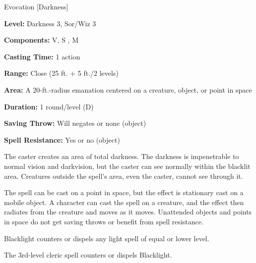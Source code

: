 
Evocation [Darkness]

\textbf{Level:} Darkness 3, Sor/Wiz 3

\textbf{Components:} V, S , M

\textbf{Casting Time:} 1 action

\textbf{Range:} Close (25 ft. + 5 ft./2 levels)

\textbf{Area:} A 20-ft.-radius emanation centered on a creature, object, or point in space

\textbf{Duration:} 1 round/level (D)

\textbf{Saving Throw:} Will negates or none (object)

\textbf{Spell Resistance:} Yes or no (object)

The caster creates an area of total darkness. The darkness is impenetrable to normal 
vision and darkvision, but the caster can see normally within the blacklit area. 
Creatures outside the spell's area, even the caster, cannot see through it.

The spell can be cast on a point in space, but the effect is stationary cast on 
a mobile object. A character can cast the spell on a creature, and the effect then 
radiates from the creature and moves as it moves. Unattended objects and points 
in space do not get saving throws or benefit from spell resistance.

Blacklight counters or dispels any light spell of equal or lower level.

The 3rd-level cleric spell  counters or dispels Blacklight.

